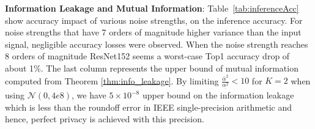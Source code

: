 \textbf{Information Leakage and Mutual Information}: %
Table~\ref{tab:inferenceAcc} show accuracy impact of  various noise strengths, on the inference accuracy. For noise strengths that have 7 orders of magnitude higher variance than the input signal, negligible accuracy losses were observed. When the noise strength reaches 8 orders of magnitude ResNet152 seems a worst-case  Top1 accuracy drop of about 1\%. The last column represents the upper bound of mutual information computed from Theorem \ref{thm:info_leakage}. By limiting $\frac{\bar\alpha^2}{\underset{\bar{}} {\alpha^2}} < 10$ for $K=2$ when using $\mathcal N(0, 4e8)$, we have $5\times 10^{-8}$ upper bound on the information leakage which is less than the roundoff error in IEEE single-precision arithmetic and hence, perfect privacy is achieved with this precision.  





 
 


